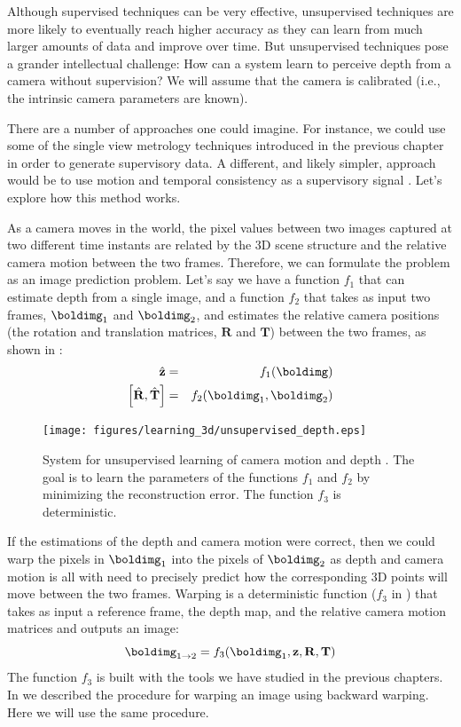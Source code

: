 Although supervised techniques can be very effective, unsupervised techniques are more likely to eventually reach higher accuracy as they can learn from much larger amounts of data and improve over time. But unsupervised techniques pose a grander intellectual challenge: How can a system learn to perceive depth from a camera without supervision? We will assume that the camera is calibrated (i.e., the intrinsic camera parameters are known).

There are a number of approaches one could imagine. For instance, we could use some of the single view metrology techniques introduced in the previous chapter in order to generate supervisory data. A different, and likely simpler, approach would be to use motion and temporal consistency as a supervisory signal \cite{Tinghui2017}. Let's explore how this method works.

As a camera moves in the world, the pixel values between two images captured at two different time instants are related by the 3D scene structure and the relative camera motion between the two frames. Therefore, we can formulate the problem as an image prediction problem.
Let's say we have a function $f_1$ that can estimate depth from a single image, and a function $f_2$ that takes as input two frames, $\boldimg_1$ and $\boldimg_2$, and estimates the relative camera positions (the rotation and translation matrices, $\mathbf{R}$ and $\mathbf{T}$) between the two frames, as shown in \fig{\ref{fig:unsupervised_depth_system}}:
\begin{eqnarray}
    \hat{\mathbf{z}} &=& f_1(\boldimg) \\
    \left[ \hat{\mathbf{R}},\hat{\mathbf{T}} \right] &=& f_2(\boldimg_1,\boldimg_2)
\end{eqnarray}

\begin{figure}[t]
    \centerline{
        \texttt{[image: figures/learning\_3d/unsupervised\_depth.eps]}
    }
    \caption{System for unsupervised learning of camera motion and depth \cite{Tinghui2017}. The goal is to learn the parameters of the functions $f_1$ and $f_2$ by minimizing the reconstruction error. The function $f_3$ is deterministic.}
    \label{fig:unsupervised_depth_system}
\end{figure}


If the estimations of the depth and camera motion were correct, then we could warp the pixels in $\boldimg_1$ into the pixels of $\boldimg_2$ as depth and camera motion is all with need to precisely predict how the corresponding 3D points will move between the two frames. Warping is a deterministic function ($f_3$ in \fig{\ref{fig:unsupervised_depth_system}}) that takes as input a reference frame, the depth map, and the relative camera motion matrices and outputs an image:
\begin{equation}
    \boldimg_{1 \rightarrow 2} =
    f_3(\boldimg_1, \mathbf{z}, \mathbf{R}, \mathbf{T})
\end{equation}
The function $f_3$ is built with the tools we have studied in the previous chapters.
In \sect{\ref{sect:image_warping}} we described the procedure for warping an image using backward warping. Here we will use the same procedure.


